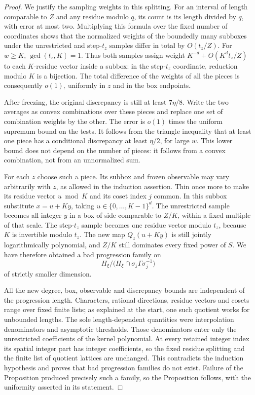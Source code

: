 \begin{proof}
We justify the sampling weights in this splitting.  For an interval
of length comparable to $Z$ and any residue modulo $q$, its count is
its length divided by $q$, with error at most two.  Multiplying this
formula over the fixed number of coordinates shows that the normalized
weights of the boundedly many subboxes under the unrestricted and
step-$t_z$ samples differ in total by $O(t_z/Z)$.  For $w\geq K$,
$\gcd(t_z,K)=1$.  Thus both samples assign weight
$K^{-d}+O(K^dt_z/Z)$ to each $K$-residue vector inside a subbox:
in the step-$t_z$ coordinate, reduction modulo $K$ is a bijection.
The total difference of the weights of all the pieces is consequently
$o(1)$, uniformly in $z$ and in the box endpoints.

After freezing, the original discrepancy is still at least
$7\eta/8$.  Write the two averages as convex combinations over these
pieces and replace one set of combination weights by the other.
The error is $o(1)$ times the uniform supremum bound on the tests.
It follows from the triangle inequality that at least one piece has
a conditional discrepancy at least $\eta/2$, for large $w$.
This lower bound does not depend on the number of pieces: it follows
from a convex combination, not from an unnormalized sum.

For each $z$ choose such a piece.  Its subbox and frozen observable may
vary arbitrarily with $z$, as allowed in the induction assertion.
Thin once more to make its residue vector $u\bmod K$ and its coset
index $j$ common.  In this subbox substitute
$x=u+Ky$, taking $u\in\{0,\ldots,K-1\}^d$.  The unrestricted
sample becomes all integer $y$ in a box of side comparable to $Z/K$,
within a fixed multiple of that scale.  The step-$t_z$ sample becomes
one residue vector modulo $t_z$, because $K$ is invertible modulo
$t_z$.  The new map $Q_z(u+Ky)$ is still jointly logarithmically
polynomial, and $Z/K$ still dominates every fixed power of $S$.
We have therefore obtained a bad progression family on
\[
 H_\xi/\bigl(H_\xi\cap\sigma_j\Gamma\sigma_j^{-1}\bigr)
\]
of strictly smaller dimension.

All the new degree, box, observable and discrepancy bounds are
independent of the progression length.  Characters, rational
directions, residue vectors and cosets range over fixed finite lists;
as explained at the start, one such quotient works for unbounded
lengths.  The sole length-dependent quantities were interpolation
denominators and asymptotic thresholds.  Those denominators enter only
the unrestricted coefficients of the kernel polynomial.  At every
retained integer index its spatial integer part has integer
coefficients, so the fixed residue splitting and the finite list of
quotient lattices are unchanged.  This contradicts the
induction hypothesis and proves that bad progression families do not
exist.  Failure of the Proposition produced precisely such a family,
so the Proposition follows, with the uniformity asserted in its
statement.
\end{proof}

